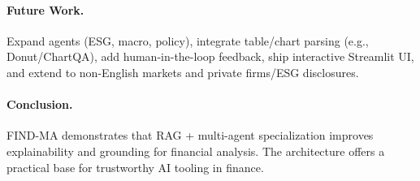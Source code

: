 \documentclass[11pt]{article}
\newcommand{\findma}{\textsc{FIND-MA}}
\begin{document}
\paragraph{Future Work.}
Expand agents (ESG, macro, policy), integrate table/chart parsing (e.g., Donut/ChartQA), add human-in-the-loop feedback, ship interactive Streamlit UI, and extend to non-English markets and private firms/ESG disclosures.

\paragraph{Conclusion.}
\findma{} demonstrates that RAG + multi-agent specialization improves explainability and grounding for financial analysis. The architecture offers a practical base for trustworthy AI tooling in finance.



\end{document}
